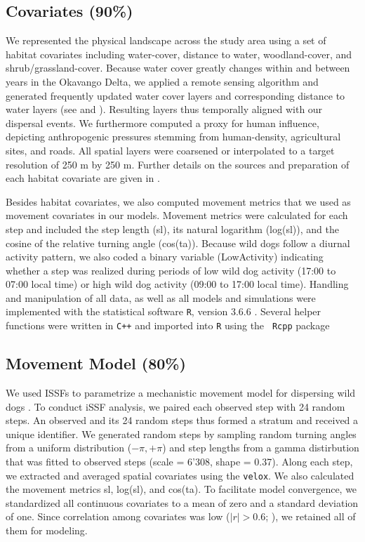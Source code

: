 \documentclass[abstract=on,10pt,a4paper,bibliography=totocnumbered]{article}
\begin{document}
\subsection{Covariates (90\%)}
We represented the physical landscape across the study area using a set of
habitat covariates including water-cover, distance to water, woodland-cover, and
shrub/grassland-cover. Because water cover greatly changes within and between
years in the Okavango Delta, we applied a remote sensing algorithm and generated
frequently updated water cover layers and corresponding distance to water layers
(see \citealp{Wolski.2017} and \citealp{Hofmann.2021}). Resulting layers thus
temporally aligned with our dispersal events. We furthermore computed a proxy
for human influence, depicting anthropogenic pressures stemming from
human-density, agricultural sites, and roads. All spatial layers were coarsened
or interpolated to a target resolution of 250 m by 250 m. Further details on the
sources and preparation of each habitat covariate are given in
\cite{Hofmann.2021}.

Besides habitat covariates, we also computed movement metrics that we used as
movement covariates in our models. Movement metrics were calculated for each
step and included the step length (\textsf{sl}), its natural logarithm
(\textsf{log(sl)}), and the cosine of the relative turning angle
(\textsf{cos(ta)}). Because wild dogs follow a diurnal activity pattern, we also
coded a binary variable (\textsf{LowActivity}) indicating whether a step was
realized during periods of low wild dog activity (17:00 to 07:00 local time) or
high wild dog activity (09:00 to 17:00 local time). Handling and manipulation of
all data, as well as all models and simulations were implemented with the
statistical software {\tt R}, version 3.6.6 \citep{R.2019}. Several helper
functions were written in {\tt C++} and imported into {\tt R} using the {\tt
Rcpp} package \citep{Eddelbuettel.2011, Eddelbuettel.2013}

\subsection{Movement Model (80\%)}
We used ISSFs to parametrize a mechanistic movement model for dispersing wild
dogs \citep{Avgar.2016}. To conduct iSSF analysis, we paired each observed step
with 24 random steps. An observed and its 24 random steps thus formed a stratum
and received a unique identifier. We generated random steps by sampling random
turning angles from a uniform distribution (\(-\pi, +\pi\)) and step lengths
from a gamma distirbution that was fitted to observed steps (scale = 6'308,
shape = 0.37). Along each step, we extracted and averaged spatial covariates
using the {\tt velox}. We also calculated the movement metrics \textsf{sl},
\textsf{log(sl)}, and \textsf{cos(ta)}. To facilitate model convergence, we
standardized all continuous covariates to a mean of zero and a standard
deviation of one. Since correlation among covariates was low (\(|r| > 0.6\);
\citealp{Latham.2011}), we retained all of them for modeling.
\end{document}
